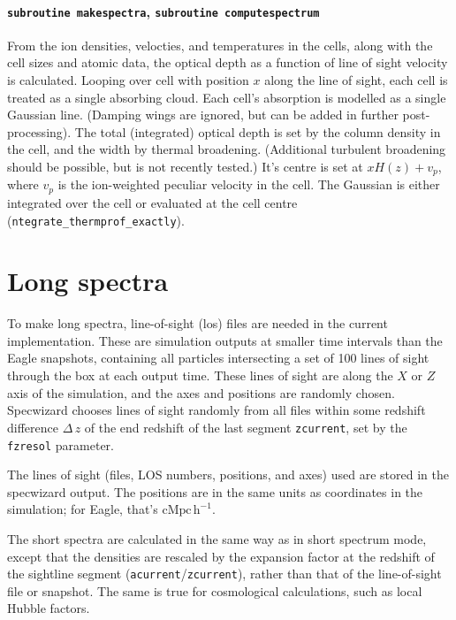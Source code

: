 \documentclass{report}
\newcommand{\param}[1]{{\tt #1}}
\begin{document}
\paragraph{{\tt subroutine makespectra}, {\tt subroutine computespectrum}}
From the ion densities, velocties, and temperatures in the cells, along with the cell sizes and atomic data, the optical depth as a function of line of sight velocity is calculated. 
Looping over cell with position $x$ along the line of sight, each cell is treated as a single absorbing cloud. 
Each cell's absorption is modelled as a single Gaussian line. (Damping wings are ignored, but can be added in further post-processing). The total (integrated) optical depth is set by the column density in the cell, and the width by thermal broadening. (Additional turbulent broadening should be possible, but is not recently tested.) It's centre is set at $x H(z) + v_p$, where $v_p$ is the ion-weighted peculiar velocity in the cell. The Gaussian is either integrated over the cell or evaluated at the cell centre (\param{ntegrate\_thermprof\_exactly}).
 

\section{Long spectra}
To make long spectra, line-of-sight (los) files are needed in the current implementation. These are simulation outputs at smaller time intervals than the Eagle snapshots, containing all particles intersecting a set of 100 lines of sight through the box at each output time. These lines of sight are along the $X$ or $Z$ axis of the simulation, and the axes and positions are randomly chosen. Specwizard chooses lines of sight randomly from all files within some redshift difference $\Delta \, z$ of the end redshift of the last segment \param{zcurrent}, set by the \param{fzresol} parameter.

The lines of sight (files, LOS numbers, positions, and axes) used are stored in the specwizard output. The positions are in the same units as coordinates in the simulation; for Eagle, that's $\mathrm{cMpc} \, \mathrm{h}^{-1}$.

The short spectra are calculated in the same way as in short spectrum mode, except that the densities are rescaled by the expansion factor at the redshift of the sightline segment (\param{acurrent}/\param{zcurrent}), rather than that of the line-of-sight file or snapshot. The same is true for cosmological calculations, such as local Hubble factors.
\end{document}
